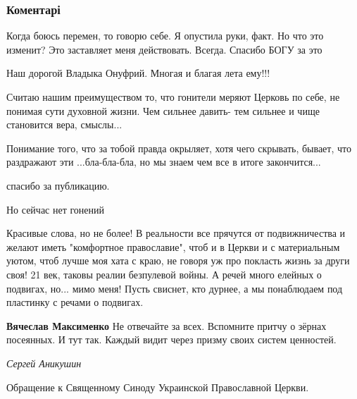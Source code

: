  
 
 
 
 
\subsubsection{Коментарі}

\begin{itemize} %

Когда боюсь перемен, то говорю себе. Я опустила руки, факт. Но что это изменит?
Это заставляет меня действовать. Всегда. Спасибо БОГУ за это

Наш дорогой Владыка Онуфрий. Многая и благая лета ему!!!


Считаю нашим преимуществом то, что гонители меряют Церковь по себе, не понимая
сути духовной жизни. Чем сильнее давить- тем сильнее и чище становится вера,
смыслы...

Понимание того, что за тобой правда окрыляет, хотя чего скрывать, бывает, что
раздражают эти ...бла-бла-бла, но мы знаем чем все в итоге закончится...

спасибо за публикацию.

Но сейчас нет гонений


Красивые слова, но не более! В реальности все прячутся от подвижничества и
желают иметь "комфортное православие", чтоб и в Церкви и с материальным уютом,
чтоб лучше моя хата с краю, не говоря уж про покласть жизнь за други своя! 21
век, таковы реалии безпулевой войны. А речей много елейных о подвигах, но...
мимо меня! Пусть свиснет, кто дурнее, а мы понаблюдаем под пластинку с речами о
подвигах.

\begin{itemize} %
\textbf{Вячеслав Максименко} Не отвечайте за всех. Вспомните притчу о зёрнах посеянных. И тут так. Каждый видит через призму своих систем ценностей.
\end{itemize} %

\emph{Сергей Аникушин}

Обращение к Священному Синоду Украинской Православной Церкви.


\end{itemize}

